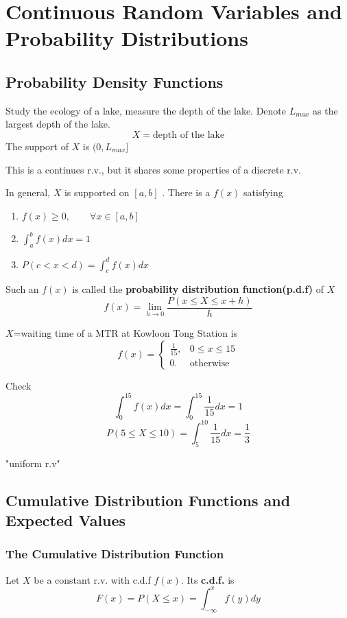 \chapter{Continuous Random Variables and Probability Distributions}
\section{Probability Density Functions}
\begin{exmp}
Study the ecology of a lake, measure the depth of the lake. Denote $L_{max}$ as the largest depth of the lake.
\[X = \text{depth of the lake}\]
The support of $X$ is $(0, L_{max}]$ 

This is a continues r.v., but it shares some properties of a discrete r.v.
\end{exmp}

\begin{defn}
In general, $X$ is supported on $[a,b]$ . There is a $f(x)$ satisfying
\begin{enumerate}
\item $f(x) \geq 0, \qquad \forall x \in [a,b]$
\item $\int _a^b f(x) dx=1$
\item $P(c<x<d)=\int _c^d f(x)dx$
\end{enumerate}

Such an $f(x)$ is called the \textbf{probability distribution function(p.d.f)} of $X$
\[f(x)=\lim_{h \to 0} \frac{P(x \leq X \leq x+h)}{h} \]
\end{defn}

\begin{exmp}
$X$=waiting time of a MTR at Kowloon Tong Station is 
\[f(x)=\begin{cases}
\frac{1}{15}, 	&0 \leq x \leq 15\\
0. &\text{otherwise}
\end{cases}\]

Check
\[\int_0^{15} f(x)dx=\int_0^{15} \frac{1}{15}dx=1\]
\[P(5\leq X \leq 10)=\int_5^{10} \frac{1}{15}dx=\frac{1}{3}\]

"uniform r.v"
\end{exmp}

\section{Cumulative Distribution Functions and Expected Values}
\subsection{The Cumulative Distribution Function}
\begin{defn}
Let $X$ be a constant r.v. with c.d.f $f(x)$. Its \textbf{c.d.f.} is 
\[F(x)=P(X \leq x)=\int_{-\infty}^{x}f(y)dy\]
\end{defn}

